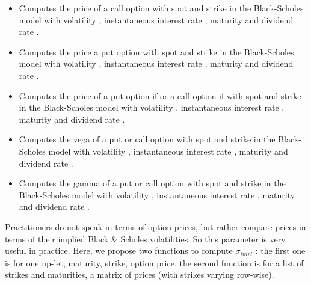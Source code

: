 \begin{itemize}
\item 
  \sshortdescribe Computes the price of a call option with spot 
  and strike  in the Black-Scholes model with volatility ,
  instantaneous interest rate , maturity  and dividend rate
  .

\item 
  \sshortdescribe Computes the price a put option with spot 
  and strike  in the Black-Scholes model with volatility ,
  instantaneous interest rate , maturity  and dividend rate
  .

\item 
  \sshortdescribe Computes the price of a put option if  or a
  call option if  with spot  and strike  in the
  Black-Scholes model with volatility , instantaneous interest rate
  , maturity  and dividend rate .

\item 
  \sshortdescribe Computes the vega of a put or call option with spot 
  and strike  in the Black-Scholes model with volatility ,
  instantaneous interest rate , maturity  and dividend rate
  .

\item 
  \sshortdescribe Computes the gamma of a put or call option with spot 
  and strike  in the Black-Scholes model with volatility ,
  instantaneous interest rate , maturity  and dividend rate
  .
\end{itemize}

Practitioners do not speak in terms of option prices, but rather compare
prices in terms of their implied Black \& Scholes volatilities. So this
parameter is very useful in practice. Here, we propose two functions to
compute $\sigma_{impl}$ : the first one is for one up-let, maturity,
strike, option price.  the second function is for a list of strikes and
maturities, a matrix of prices (with strikes varying row-wise).

